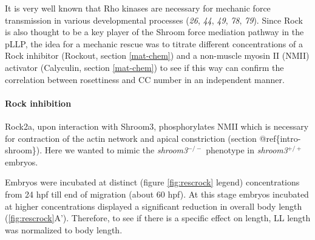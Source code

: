 \documentclass[11pt,singlespacinge,twoside]{reedthesis} %
\theoremstyle{definition}
\theoremstyle{definition}
\theoremstyle{definition}
\theoremstyle{remark}
\begin{document}
It is very well known that Rho kinases are necessary for mechanic force transmission in various developmental processes (\emph{26}, \emph{44}, \emph{49}, \emph{78}, \emph{79}). Since Rock is also thought to be a key player of the Shroom force mediation pathway in the pLLP, the idea for a mechanic rescue was to titrate different concentrations of a Rock inhibitor (Rockout, section \ref{mat-chem}) and a non-muscle myosin II (NMII) activator (Calyculin, section \ref{mat-chem}) to see if this way can confirm the correlation between rosettiness and CC number in an independent manner.

\hypertarget{rock-inhibition}{%
\paragraph{Rock inhibition}\label{rock-inhibition}}

Rock2a, upon interaction with Shroom3, phosphorylates NMII which is necessary for contraction of the actin network and apical constriction (section @ref\{intro-shroom\}). Here we wanted to mimic the \emph{shroom3}\(^{-/-}\) phenotype in \emph{shroom3}\(^{+/+}\) embryos.

Embryos were incubated at distinct (figure \ref{fig:rescrock} legend) concentrations from 24 hpf till end of migration (about 60 hpf). At this stage embryos incubated at higher concentrations displayed a significant reduction in overall body length (\ref{fig:rescrock}A'). Therefore, to see if there is a specific effect on length, LL length was normalized to body length.
\end{document}
